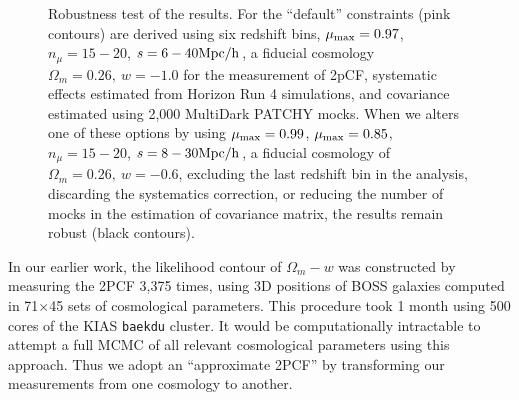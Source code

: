 \documentclass[prl,twocolumn,superscriptaddress,aps,amsmath,amssymb,nofootinbib,altaffilletter]{revtex4}
\begin{document}
\begin{figure}
   \caption{\label{fig_contest}
   Robustness test of the results.
   For the ``default'' constraints (pink contours) are derived using six redshift bins, 
   $\mu_{\rm max}=0.97$, $n_{\mu}=15-20$, $s=6-40 \rm Mpc/h$,
   a fiducial cosmology $\Omega_m=0.26,\ w=-1.0$ for the measurement of 2pCF,
   systematic effects estimated from Horizon Run 4 simulations, 
   and covariance estimated using 2,000 MultiDark PATCHY mocks.
   When we alters one of these options by using $\mu_{\rm max}=0.99$, 
   $\mu_{\rm max}=0.85$, $n_{\mu}=15-20$, $s=8-30 \rm Mpc/h$, 
   a fiducial cosmology of $\Omega_m=0.26,\ w=-0.6$, 
   excluding the last redshift bin in the analysis, 
   discarding the systematics correction, 
   or reducing the number of mocks in the estimation of covariance matrix,
   the results remain robust (black contours).
   }
\end{figure}

In our earlier work\cite{Li2016}, the likelihood contour of $\Omega_m-w$ was constructed by
measuring the 2PCF 3,375 times,
using 3D positions of BOSS galaxies computed in 71$\times$45 sets of cosmological parameters.
This procedure took 1 month using 500 cores of the KIAS {\texttt {baekdu}} cluster.
It would be computationally intractable to attempt a full MCMC of all relevant cosmological parameters using this approach. 
Thus we adopt an ``approximate 2PCF'' by transforming our measurements from one cosmology to another.
\end{document}
